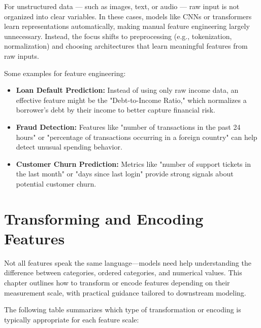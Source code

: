\documentclass[12pt,openany]{book}
\begin{document}
For unstructured data — such as images, text, or audio — raw input is not organized into clear variables. In these cases, models like CNNs or transformers learn representations automatically, making manual feature engineering largely unnecessary. Instead, the focus shifts to preprocessing (e.g., tokenization, normalization) and choosing architectures that learn meaningful features from raw inputs.


Some examples for feature engineering:
\begin{itemize}
    \item \textbf{Loan Default Prediction:} Instead of using only raw income data, an effective feature might be the "Debt-to-Income Ratio," which normalizes a borrower’s debt by their income to better capture financial risk.
    \item \textbf{Fraud Detection:} Features like "number of transactions in the past 24 hours" or "percentage of transactions occurring in a foreign country" can help detect unusual spending behavior.
    \item \textbf{Customer Churn Prediction:} Metrics like "number of support tickets in the last month" or "days since last login" provide strong signals about potential customer churn.
\end{itemize}



\section{Transforming and Encoding Features}

Not all features speak the same language—models need help understanding the difference between categories, ordered categories, and numerical values. This chapter outlines how to transform or encode features depending on their measurement scale, with practical guidance tailored to downstream modeling.
\newline

The following table summarizes which type of transformation or encoding is typically appropriate for each feature scale:
\end{document}
